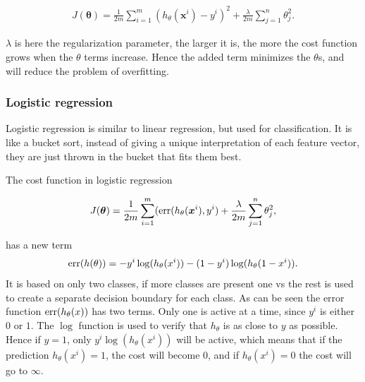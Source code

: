             \begin{align}
                J(\bm\theta) = \frac{1}{2m}  \sum_{i=1}^{m}(h_\theta(\bm x^i) - y^i)^2 + \frac{\lambda}{2m}\sum_{j=1}^n\theta^2_j.
                \label{linreg:reg}
            \end{align}
            
            $\lambda$ is here the regularization parameter, the larger it is, the more the cost function grows when the $\theta$ terms increase. Hence the added term minimizes the $\theta$s, and will reduce the problem of overfitting.
            
            
            
        
        \subsubsection{Logistic regression}
            
            Logistic regression is similar to linear regression, but used for classification. It is like a bucket sort, instead of giving a unique interpretation of each feature vector, they are just thrown in the bucket that fits them best. 
            
            The cost function in logistic regression 
            
            \begin{align}
                J(\bm\theta) = \frac{1}{2m} \sum_{i=1}^{m}(\operatorname{err}(h_\theta(\bm x^i),y^i) + \frac{\lambda}{2m}\sum_{j=1}^n\theta^2_j,
                \label{logreg:err}
            \end{align}
            
            has a new term 
             \begin{align}
                \operatorname{err}(h(\theta)) = - y^i\log(h_\theta(x^i)) - (1-y^i)\log(h_\theta(1 - x^i)).
                \label{logreg:h}
            \end{align}
            It is based on only two classes, if more classes are present one vs the rest is used to create a separate decision boundary for each class. As can be seen the error function $\operatorname{err}(h_\theta(x))$ has two terms. Only one is active at a time, since $y^i$ is either $0$ or $1$. The $\log$ function is used to verify that $h_\theta$ is as close to $y$ as possible. Hence if $y=1$, only $y^i\log(h_\theta(x^i))$ will be active, which means that if the prediction $h_\theta(x^i) = 1$, the cost will become $0$, and if $h_\theta(x^i) = 0$ the cost will go to $\infty$. 
            
